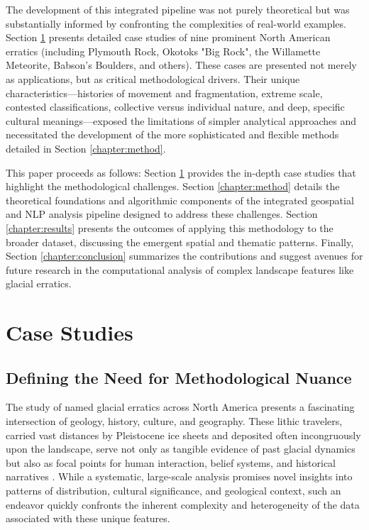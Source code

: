 \documentclass[
11pt, %
english, %
singlespacing, %
headsepline, %
]{MastersDoctoralThesis} %
\begin{document}
The development of this integrated pipeline was not purely theoretical but was substantially informed by confronting the complexities of real-world examples. Section \ref{chapter:cases} presents detailed case studies of nine prominent North American erratics (including Plymouth Rock, Okotoks "Big Rock", the Willamette Meteorite, Babson's Boulders, and others). These cases are presented not merely as applications, but as critical methodological drivers. Their unique characteristics—histories of movement and fragmentation, extreme scale, contested classifications, collective versus individual nature, and deep, specific cultural meanings—exposed the limitations of simpler analytical approaches and necessitated the development of the more sophisticated and flexible methods detailed in Section \ref{chapter:method}.

This paper proceeds as follows: Section \ref{chapter:cases} provides the in-depth case studies that highlight the methodological challenges. Section \ref{chapter:method} details the theoretical foundations and algorithmic components of the integrated geospatial and NLP analysis pipeline designed to address these challenges. Section \ref{chapter:results} presents the outcomes of applying this methodology to the broader dataset, discussing the emergent spatial and thematic patterns. Finally, Section \ref{chapter:conclusion} summarizes the contributions and suggest avenues for future research in the computational analysis of complex landscape features like glacial erratics.


\chapter{Case Studies}
\label{chapter:cases}

\section{Defining the Need for Methodological Nuance}
\label{sec:nuance}

The study of named glacial erratics across North America presents a fascinating intersection of geology, history, culture, and geography. These lithic travelers, carried vast distances by Pleistocene ice sheets and deposited often incongruously upon the landscape, serve not only as tangible evidence of past glacial dynamics but also as focal points for human interaction, belief systems, and historical narratives \cite{Flint1971, Benn2010}. While a systematic, large-scale analysis promises novel insights into patterns of distribution, cultural significance, and geological context, such an endeavor quickly confronts the inherent complexity and heterogeneity of the data associated with these unique features.
\end{document}
